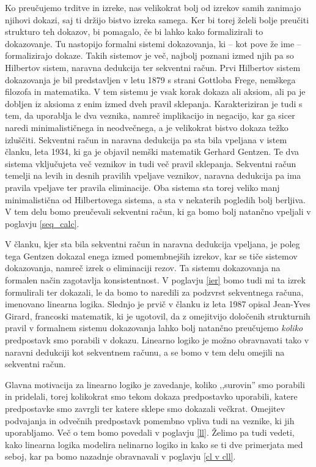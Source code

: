 Ko preučujemo trditve in izreke, nas velikokrat bolj od izrekov samih zanimajo njihovi dokazi, saj ti držijo bistvo izreka samega. Ker bi torej želeli bolje preučiti strukturo teh dokazov, bi pomagalo, če bi lahko kako formalizirali to dokazovanje. Tu nastopijo formalni sistemi dokazovanja, ki -- kot pove že ime -- formalizirajo dokaze. Takih sistemov je več, najbolj poznani izmed njih pa so Hilbertov sistem, naravna dedukcija ter sekventni račun. Prvi Hilbertov sistem dokazovanja je bil predstavljen v letu 1879 s strani Gottloba Frege, nemškega filozofa in matematika. V tem sistemu je vsak korak dokaza ali aksiom, ali pa je dobljen iz aksioma z enim izmed dveh pravil sklepanja. Karakteriziran je tudi s tem, da uporablja le dva veznika, namreč implikacijo in negacijo, kar ga sicer naredi minimalističnega in neodvečnega, a je velikokrat bistvo dokaza težko izluščiti. Sekventni račun in naravna dedukcija pa sta bila vpeljana v istem članku, leta 1934, ki ga je objavil nemški matematik Gerhard Gentzen. Te dva sistema vključujeta več veznikov in tudi več pravil sklepanja. Sekventni račun temelji na levih in desnih pravilih vpeljave veznikov, naravna dedukcija pa ima pravila vpeljave ter pravila eliminacije. Oba sistema sta torej veliko manj minimalistična od Hilbertovega sistema, a sta v nekaterih pogledih bolj berljiva. V tem delu bomo preučevali sekventni račun, ki ga bomo bolj natančno vpeljali v poglavju \ref{seq_calc}.

V članku, kjer sta bila sekventni račun in naravna dedukcija vpeljana, je poleg tega Gentzen dokazal enega izmed pomembnejših izrekov, kar se tiče sistemov dokazovanja, namreč izrek o eliminaciji rezov. Ta sistemu dokazovanja na formalen način zagotavlja konsistentnost. V poglavju \ref{ier} bomo tudi mi ta izrek formulirali ter dokazali, le da bomo to naredili za podzvrst sekventnega računa, imenovano linearna logika. Slednjo je prvič v članku iz leta 1987 opisal Jean-Yves Girard, francoski matematik, ki je ugotovil, da z omejitvijo določenih strukturnih pravil v formalnem sistemu dokazovanja lahko bolj natančno preučujemo \emph{koliko} predpostavk smo porabili v dokazu. Linearno logiko je možno obravnavati tako v naravni dedukciji kot sekventnem računu, a se bomo v tem delu omejili na sekventni račun.

Glavna motivacija za linearno logiko je zavedanje, koliko ,,surovin'' smo porabili in pridelali, torej kolikokrat smo tekom dokaza predpostavko uporabili, katere predpostavke smo zavrgli ter katere sklepe smo dokazali večkrat. Omejitev podvajanja in odvečnih predpostavk pomembno vpliva tudi na veznike, ki jih uporabljamo. Več o tem bomo povedali v poglavju \ref{ll}. Želimo pa tudi vedeti, kako linearna logika modelira nelinarno logiko in kako se ti dve primerjata med seboj, kar pa bomo nazadnje obravnavali v poglavju \ref{cl v cll}.
